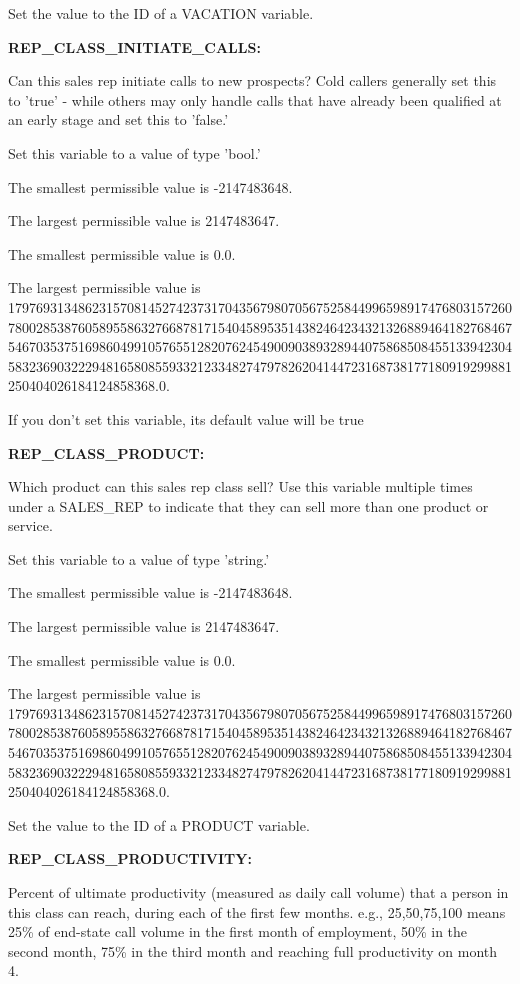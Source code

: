 Set the value to the ID of a VACATION variable.


\textbf{REP\_CLASS\_INITIATE\_CALLS:}


Can this sales rep initiate calls to new prospects?  Cold callers generally set this to 'true' - while others may only handle calls that have already been qualified at an early stage and set this to 'false.'

Set this variable to a value of type 'bool.'

The smallest permissible value is -2147483648.

The largest permissible value is 2147483647.

The smallest permissible value is 0.0.

The largest permissible value is 179769313486231570814527423731704356798070567525844996598917476803157260780028538760589558632766878171540458953514382464234321326889464182768467546703537516986049910576551282076245490090389328944075868508455133942304583236903222948165808559332123348274797826204144723168738177180919299881250404026184124858368.0.

If you don't set this variable, its default value will be true


\textbf{REP\_CLASS\_PRODUCT:}


Which product can this sales rep class sell?  Use this variable multiple times under a SALES\_REP to indicate that they can sell more than one product or service.

Set this variable to a value of type 'string.'

The smallest permissible value is -2147483648.

The largest permissible value is 2147483647.

The smallest permissible value is 0.0.

The largest permissible value is 179769313486231570814527423731704356798070567525844996598917476803157260780028538760589558632766878171540458953514382464234321326889464182768467546703537516986049910576551282076245490090389328944075868508455133942304583236903222948165808559332123348274797826204144723168738177180919299881250404026184124858368.0.

Set the value to the ID of a PRODUCT variable.


\textbf{REP\_CLASS\_PRODUCTIVITY:}


Percent of ultimate productivity (measured as daily call volume) that a person in this class can reach, during each of the first few months.  e.g., 25,50,75,100 means 25\% of end-state call volume in the first month of employment, 50\% in the second month, 75\% in the third month and reaching full productivity on month 4.


